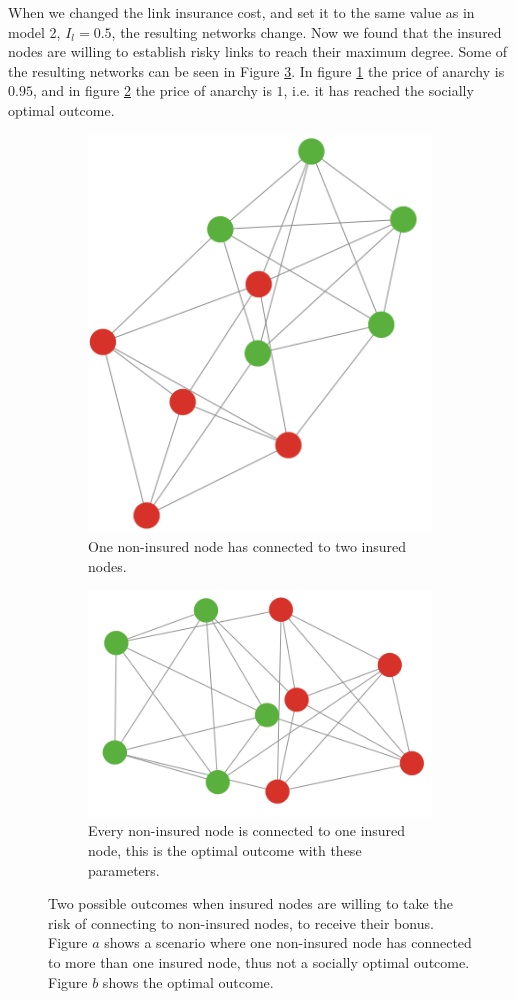When we changed the link insurance cost, and set it to the same value as in model 2, $I_{l}=0.5$, the resulting networks change. Now we found that the insured nodes are willing to establish risky links to reach their maximum degree. Some of the resulting networks can be seen in Figure \ref{fig:bonusviolating}.
In figure \ref{fig:bonusvolating:a} the price of anarchy is $0.95$, and in figure \ref{fig:bonusvolating:b} the price of anarchy is $1$, i.e. it has reached the socially optimal outcome.
\begin{figure}[h]
\centering
\begin{subfigure}{.9\textwidth}
  \centering
  \includegraphics[width=0.55\linewidth]{../Figures/BonusGameViolating.png}
  \caption{\label{fig:bonusvolating:a} One non-insured node has connected to two insured nodes.}
\end{subfigure}
\quad
\begin{subfigure}{.9\textwidth}
  \centering
  \includegraphics[width=0.55\linewidth]{../Figures/BonusGameViolatingOptimal.png}
  \caption{\label{fig:bonusvolating:b}Every non-insured node is connected to one insured node, this is the optimal outcome with these parameters.}
\end{subfigure}
  
  \caption[Two possible outcomes when insured nodes are willing to take the risk of connecting to non-insured nodes, to receive their bonus.]{\label{fig:bonusviolating} Two possible outcomes when insured nodes are willing to take the risk of connecting to non-insured nodes, to receive their bonus. Figure $a$ shows a scenario where one non-insured node has connected to more than one insured node, thus not a socially optimal outcome. Figure $b$ shows the optimal outcome. }
\end{figure}


